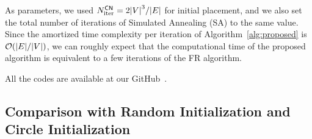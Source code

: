 \documentclass[dvipdfmx,10pt,journal,compsoc]{IEEEtran}
\begin{document}
As parameters, we used $N_\mathrm{iter}^\mathsf{CN} = 2 \abs{V}^3 / \abs{E}$ for initial placement, and we also set the total number of iterations of Simulated Annealing (\textsf{SA}) to the same value.
Since the amortized time complexity per iteration of Algorithm~\ref{alg:proposed} is $\order{\abs{E} / \abs{V}}$, we can roughly expect that the computational time of the proposed algorithm is equivalent to a few iterations of the FR algorithm.

All the codes are available at our GitHub~\cite{ThisPaperGitHub}.

\subsection{
  Comparison with Random Initialization and Circle Initialization
}\label{ssec:exprAll}
\end{document}
